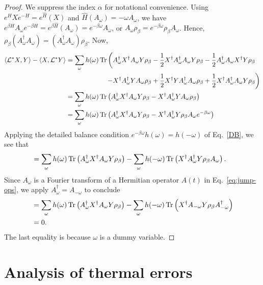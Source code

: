 \begin{proof}
We suppress the index $\alpha$ for notational convenience.
Using $e^H X e^{-H} = e^{\hat H} (X)$ and $\hat H (A_\omega) = - \omega A_\omega$, we have 
$e^{\beta H} A_\omega e^{-\beta H} = e^{\beta \hat H}(A_\omega) = e^{-\beta \omega} A_\omega$,
or $A_\omega \rho_\beta = e^{-\beta \omega} \rho_\beta A_\omega$. 
Hence, $\rho_\beta (A_\omega^\dagger A_\omega) = (A_\omega^\dagger A_\omega) \rho_\beta$.
Now,
\begin{align*}
\langle \mathcal L ^* X, Y \rangle - \langle X, \mathcal L^* Y \rangle 
&= \sum_\omega h(\omega) \mathop{\mathrm{Tr}}\nolimits\left( 
A_\omega^\dagger X^\dagger A_\omega Y \rho_\beta 
- \frac{1}{2} X^\dagger A_\omega^\dagger A_\omega  Y \rho_\beta 
- \frac{1}{2} A_\omega^\dagger A_\omega X^\dagger Y \rho_\beta
\right. \\
& \left. \quad \quad \quad \quad \quad \quad
- X^\dagger A_\omega^\dagger Y A_\omega \rho_\beta 
+ \frac{1}{2} X^\dagger Y A_\omega^\dagger A_\omega  \rho_\beta 
+ \frac{1}{2} X^\dagger A_\omega^\dagger A_\omega Y \rho_\beta
\right)\\
&= \sum_\omega h(\omega) \mathop{\mathrm{Tr}}\nolimits \left( A_\omega^\dagger X^\dagger A_\omega Y \rho_\beta 
- X^\dagger A_\omega^\dagger Y A_\omega \rho_\beta  \right) \\
&= \sum_\omega h(\omega) \mathop{\mathrm{Tr}}\nolimits \left( A_\omega^\dagger X^\dagger A_\omega Y \rho_\beta 
- X^\dagger A_\omega^\dagger Y  \rho_\beta A_\omega e^{-\beta \omega} \right)
\end{align*}
Applying the detailed balance condition $e^{-\beta \omega} h(\omega) = h(-\omega)$ of Eq.~\eqref{DB},
we see that
\begin{align*}
&=\sum_\omega h(\omega) \mathop{\mathrm{Tr}}\nolimits \left( A_\omega^\dagger X^\dagger A_\omega Y \rho_\beta \right)
- \sum_\omega h(-\omega) \mathop{\mathrm{Tr}}\nolimits \left( X^\dagger A_\omega^\dagger Y  \rho_\beta A_\omega \right) .
\end{align*}
Since $A_\omega$ is a Fourier transform of a Hermitian operator $A(t)$ in Eq.~\eqref{eq:jump-ops},
we apply $A_\omega^\dagger = A_{-\omega}$ to conclude
\begin{align*}
&=\sum_\omega h(\omega) \mathop{\mathrm{Tr}}\nolimits \left( A_\omega^\dagger X^\dagger A_\omega Y \rho_\beta \right)
- \sum_\omega h(-\omega) \mathop{\mathrm{Tr}}\nolimits \left( X^\dagger A_{-\omega} Y  \rho_\beta A_{-\omega}^\dagger \right)\\
& = 0 .
\end{align*}
The last equality is because $\omega$ is a dummy variable.
\end{proof}

\section{Analysis of thermal errors}
\label{sec:thermal}

